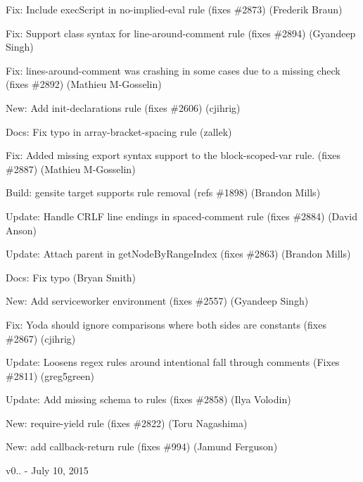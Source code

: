 \begin{DoxyItemize}
\item Fix\+: Include exec\+Script in no-\/implied-\/eval rule (fixes \#2873) (Frederik Braun)
\item Fix\+: Support class syntax for line-\/around-\/comment rule (fixes \#2894) (Gyandeep Singh)
\item Fix\+: lines-\/around-\/comment was crashing in some cases due to a missing check (fixes \#2892) (Mathieu M-\/\+Gosselin)
\item New\+: Add init-\/declarations rule (fixes \#2606) (cjihrig)
\item Docs\+: Fix typo in array-\/bracket-\/spacing rule (zallek)
\item Fix\+: Added missing export syntax support to the block-\/scoped-\/var rule. (fixes \#2887) (Mathieu M-\/\+Gosselin)
\item Build\+: gensite target supports rule removal (refs \#1898) (Brandon Mills)
\item Update\+: Handle C\+R\+LF line endings in spaced-\/comment rule (fixes \#2884) (David Anson)
\item Update\+: Attach parent in get\+Node\+By\+Range\+Index (fixes \#2863) (Brandon Mills)
\item Docs\+: Fix typo (Bryan Smith)
\item New\+: Add serviceworker environment (fixes \#2557) (Gyandeep Singh)
\item Fix\+: Yoda should ignore comparisons where both sides are constants (fixes \#2867) (cjihrig)
\item Update\+: Loosens regex rules around intentional fall through comments (Fixes \#2811) (greg5green)
\item Update\+: Add missing schema to rules (fixes \#2858) (Ilya Volodin)
\item New\+: {\ttfamily require-\/yield} rule (fixes \#2822) (Toru Nagashima)
\item New\+: add callback-\/return rule (fixes \#994) (Jamund Ferguson)
\end{DoxyItemize}

v0.. -\/ July 10, 2015


